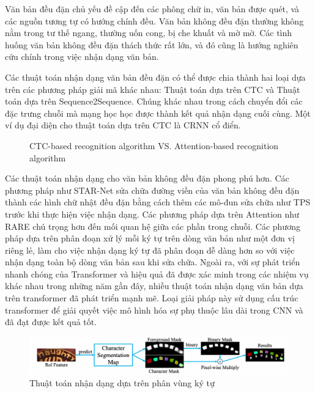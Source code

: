 Văn bản đều đặn chủ yếu đề cập đến các phông chữ in, văn bản được quét, và các nguồn tương tự có hướng chính đều. Văn bản không đều đặn thường không nằm trong tư thế ngang, thường uốn cong, bị che khuất và mờ mờ. Các tình huống văn bản không đều đặn thách thức rất lớn, và đó cũng là hướng nghiên cứu chính trong việc nhận dạng văn bản.

Các thuật toán nhận dạng văn bản đều đặn có thể được chia thành hai loại dựa trên các phương pháp giải mã khác nhau: Thuật toán dựa trên CTC và Thuật toán dựa trên Sequence2Sequence. Chúng khác nhau trong cách chuyển đổi các đặc trưng chuỗi mà mạng học học được thành kết quả nhận dạng cuối cùng. Một ví dụ đại diện cho thuật toán dựa trên CTC là CRNN cổ điển.

\begin{figure}[p]
    
    \centering
    \caption{CTC-based recognition algorithm VS. Attention-based recognition algorithm}
\end{figure}

Các thuật toán nhận dạng cho văn bản không đều đặn phong phú hơn. Các phương pháp như STAR-Net sửa chữa đường viền của văn bản không đều đặn thành các hình chữ nhật đều đặn bằng cách thêm các mô-đun sửa chữa như TPS trước khi thực hiện việc nhận dạng. Các phương pháp dựa trên Attention như RARE chú trọng hơn đến mối quan hệ giữa các phần trong chuỗi. Các phương pháp dựa trên phân đoạn xử lý mỗi ký tự trên dòng văn bản như một đơn vị riêng lẻ, làm cho việc nhận dạng ký tự đã phân đoạn dễ dàng hơn so với việc nhận dạng toàn bộ dòng văn bản sau khi sửa chữa. Ngoài ra, với sự phát triển nhanh chóng của Transformer và hiệu quả đã được xác minh trong các nhiệm vụ khác nhau trong những năm gần đây, nhiều thuật toán nhận dạng văn bản dựa trên transformer đã phát triển mạnh mẽ. Loại giải pháp này sử dụng cấu trúc transformer để giải quyết việc mô hình hóa sự phụ thuộc lâu dài trong CNN và đã đạt được kết quả tốt.

\begin{figure}
    \includegraphics[scale=0.40]{images/recognition-based-charcter-segmentation.png}
    \centering
    \caption{Thuật toán nhận dạng dựa trên phân vùng ký tự}
\end{figure}

